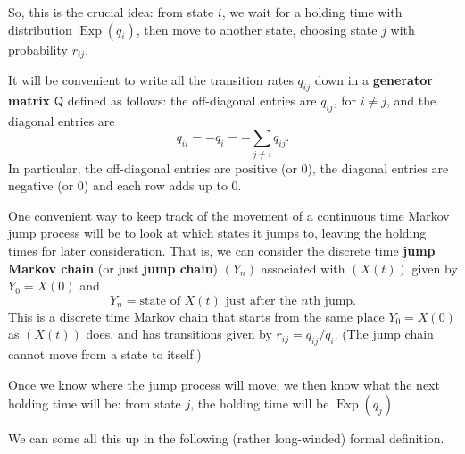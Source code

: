 \documentclass[
  a4paper,
]{article}
\theoremstyle{definition}
\theoremstyle{definition}
\theoremstyle{definition}
\theoremstyle{remark}
\begin{document}
So, this is the crucial idea: from state \(i\), we wait for a holding time with distribution \(\operatorname{Exp}(q_i)\), then move to another state, choosing state \(j\) with probability \(r_{ij}\).

It will be convenient to write all the transition rates \(q_{ij}\) down in a \textbf{generator matrix} \(\mathsf Q\) defined as follows: the off-diagonal entries are \(q_{ij}\), for \(i \neq j\), and the diagonal entries are
\[ q_{ii} = - q_i = -\sum_{j \neq i} q_{ij} . \]
In particular, the off-diagonal entries are positive (or 0), the diagonal entries are negative (or 0) and each row adds up to 0.

One convenient way to keep track of the movement of a continuous time Markov jump process will be to look at which states it jumps to, leaving the holding times for later consideration. That is, we can consider the discrete time \textbf{jump Markov chain} (or just \textbf{jump chain}) \((Y_n)\) associated with \((X(t))\) given by
\(Y_0 = X(0)\) and
\[ Y_n = \text{state of $X(t)$ just after the $n$th jump.} \]
This is a discrete time Markov chain that starts from the same place \(Y_0 = X(0)\) as \((X(t))\) does, and has transitions given by \(r_{ij} = q_{ij}/q_i\). (The jump chain cannot move from a state to itself.)

Once we know where the jump process will move, we then know what the next holding time will be: from state \(j\), the holding time will be \(\operatorname{Exp}(q_j)\)

We can some all this up in the following (rather long-winded) formal definition.
\end{document}
